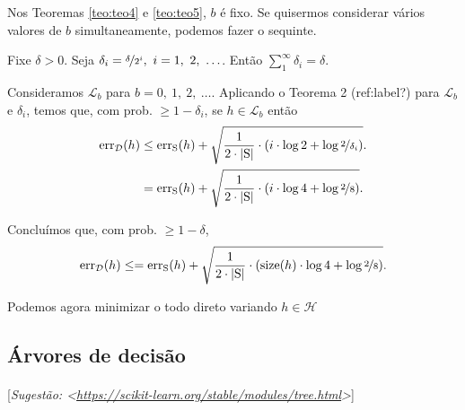 {Nos Teoremas \autoref{teo:teo4} e \autoref{teo:teo5}, $b$ é fixo. Se quisermos considerar vários valores de $b$ simultaneamente, podemos fazer o sequinte.

Fixe $\delta>0$. Seja $\delta_i=\nicefrac{\delta}{2^i},\ i=1,\ 2,\ \ldots$. Então $\sum_1^\infty \delta_i=\delta$.

Consideramos $\mathcal{L}_b$ para $b=0,\ 1,\ 2,\ \ldots$. Aplicando o Teorema 2 (ref:label?) para $\mathcal{L}_b$ e $\delta_i$, temos que, com prob. $\geq 1-\delta_i$, se $h\in\mathcal{L}_b$ então
\begin{align*}
  \mathrm{err}_\mathcal{D}\l(h\r) &\leq \mathrm{err}_\mathrm{S}\l(h\r) + \sqrt{\frac{1}{2\cdot\l|\mathrm{S}\r|}\cdot\l(i\cdot\log2 + \log\nicefrac{2}{\delta_i}\r)}. \\
                                  &= \mathrm{err}_\mathrm{S}\l(h\r) + \sqrt{\frac{1}{2\cdot\l|\mathrm{S}\r|}\cdot\l(i\cdot\log4 + \log\nicefrac{2}{8}\r)}.
\end{align*}

Concluímos que, com prob. $\geq 1-\delta$,
\[
  \mathrm{err}_\mathcal{D}\l(h\r) \leq = \mathrm{err}_\mathrm{S}\l(h\r) + \sqrt{\frac{1}{2\cdot\l|\mathrm{S}\r|}\cdot\l(\mathrm{size}\l(h\r)\cdot\log4 + \log\nicefrac{2}{8}\r)}.
\]

Podemos agora minimizar o todo direto variando $h\in\mathcal{H}$

\clearpage
\subsection{Árvores de decisão}

\paragraph{\nopunct}[\textit{Sugestão: <\href{https://scikit-learn.org/stable/modules/tree.html}{https://scikit-learn.org/stable/modules/tree.html}>}]

\begin{exemplo}
\end{exemplo}}
